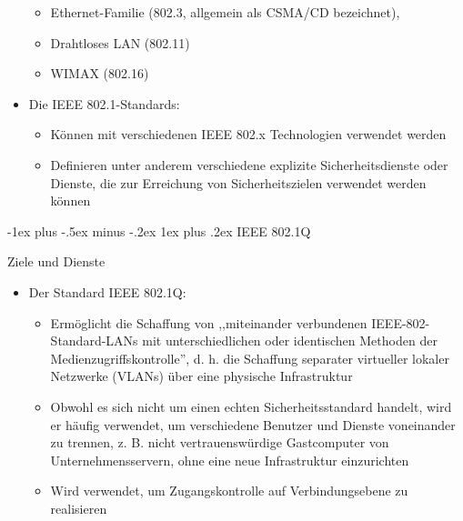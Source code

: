 \documentclass[a4paper]{article}
\makeatletter
\renewcommand{\subsubsection}{\@startsection{subsubsection}{3}{0mm}%
 {-1ex plus -.5ex minus -.2ex}%
 {1ex plus .2ex}%
 {\normalfont\small\bfseries}}
\makeatother
\begin{document}
\begin{multicols}{3}
\begin{itemize}
              \begin{itemize}
                  \item
                        Ethernet-Familie (802.3, allgemein als CSMA/CD bezeichnet),
                  \item
                        Drahtloses LAN (802.11)
                  \item
                        WIMAX (802.16)
              \end{itemize}
        \item
              Die IEEE 802.1-Standards:

              \begin{itemize}
                  \item
                        Können mit verschiedenen IEEE 802.x Technologien verwendet werden
                  \item
                        Definieren unter anderem verschiedene explizite Sicherheitsdienste
                        oder Dienste, die zur Erreichung von Sicherheitszielen verwendet
                        werden können
              \end{itemize}
    \end{itemize}


    \subsubsection{IEEE 802.1Q}

    Ziele und Dienste

    \begin{itemize}
        \item
              Der Standard IEEE 802.1Q:

              \begin{itemize}
                  \item
                        Ermöglicht die Schaffung von ,,miteinander verbundenen
                        IEEE-802-Standard-LANs mit unterschiedlichen oder identischen
                        Methoden der Medienzugriffskontrolle'', d. h. die Schaffung
                        separater virtueller lokaler Netzwerke (VLANs) über eine physische
                        Infrastruktur
                  \item
                        Obwohl es sich nicht um einen echten Sicherheitsstandard handelt,
                        wird er häufig verwendet, um verschiedene Benutzer und Dienste
                        voneinander zu trennen, z. B. nicht vertrauenswürdige Gastcomputer
                        von Unternehmensservern, ohne eine neue Infrastruktur einzurichten
                  \item
                        Wird verwendet, um Zugangskontrolle auf Verbindungsebene zu
                        realisieren
              \end{itemize}
    \end{itemize}


\end{multicols}
\end{document}
